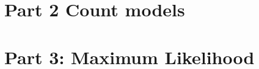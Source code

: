 \documentclass[a4paper]{article}
\begin{document}










\section{Part 2 Count models}




\section{Part 3: Maximum Likelihood}
\end{document}

